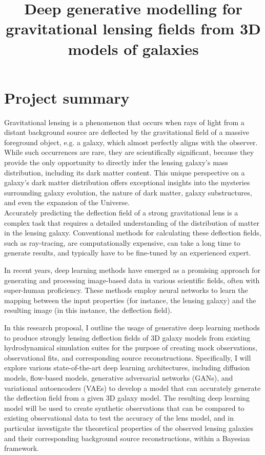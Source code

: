 \documentclass[a4paper,10pt]{article}
\date{}
\title{Deep generative modelling for gravitational lensing fields from 3D models of galaxies}
\begin{document}
\maketitle
\vspace{-0.8in}
\section*{Project summary}
\label{sec:org34b26f5}

Gravitational lensing is a phenomenon that occurs when rays of light
from a distant background source are deflected by the gravitational
field of a massive foreground object, e.g. a galaxy, which almost
perfectly aligns with the observer. While such occurrences are rare,
they are scientifically significant, because they provide the only
opportunity to directly infer the lensing galaxy's mass distribution,
including its dark matter content.  This unique perspective on a
galaxy's dark matter distribution offers exceptional insights into the
mysteries surrounding galaxy evolution, the nature of dark matter,
galaxy substructures, and even the expansion of the Universe. \\[0pt]
Accurately predicting the deflection field of a strong gravitational
lens is a complex task that requires a detailed understanding of the
distribution of matter in the lensing galaxy. Conventional methods for
calculating these deflection fields, such as ray-tracing, are
computationally expensive, can take a long time to generate results,
and typically have to be fine-tuned by an experienced expert.

In recent years, deep learning methods have emerged as a promising
approach for generating and processing image-based data in various
scientific fields, often with super-human proficiency. These methods
employ neural networks to learn the mapping between the input
properties (for instance, the lensing galaxy) and the resulting image
(in this instance, the deflection field).

In this research proposal, I outline the usage of generative deep
learning methods to produce strongly lensing deflection fields of 3D
galaxy models from existing hydrodynamical simulation suites for the
purpose of creating mock observations, observational fits, and
corresponding source reconstructions. Specifically, I will explore
various state-of-the-art deep learning architectures, including
diffusion models, flow-based models, generative adversarial networks
(GANs), and variational autoencoders (VAEs) to develop a model that
can accurately generate the deflection field from a given 3D galaxy
model. The resulting deep learning model will be used to create
synthetic observations that can be compared to existing observational
data to test the accuracy of the lens model, and in particular
investigate the theoretical properties of the observed lensing
galaxies and their corresponding background source reconstructions,
within a Bayesian framework.
\end{document}
